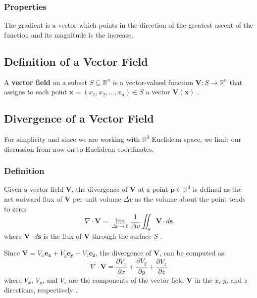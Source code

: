 \subsubsection{Properties}
The gradient is a vector which points in the direction of the greatest ascent of the function and its magnitude is the increase.

\subsection{Definition of a Vector Field}
A \textbf{vector field} on a subset \(S \subseteq \mathbb{R}^n\) is a vector-valued function \(\mathbf{V}: S \to \mathbb{R}^n\) that assigns to each point \(\mathbf{x} = (x_1, x_2, \ldots, x_n) \in S\) a vector \(\mathbf{V}(\mathbf{x})\) \cite{math-book}.

\subsection{Divergence of a Vector Field}
For simplicity and since we are working with \(\mathbb{R}^3\) Euclidean space, we limit our discussion from now on to Euclidean coordinates.

\subsubsection{Definition}
Given a vector field \(\mathbf{V}\), the divergence of  \(\mathbf{V}\) at a point \( \mathbf{p} \in \mathbb{R}^3 \) is defined as the net
outward flux of \(\mathbf{V}\) per unit volume \(\Delta v\) as the volume about the point tends to zero:
\begin{equation}
\nabla \cdot \mathbf{V} = \lim_{\Delta v \to 0} \frac{1}{\Delta v} \iint_S \mathbf{V} \cdot d\mathbf{s}
\label{eq:divergence}
\end{equation}
where \( \mathbf{V} \cdot d\mathbf{s} \) is the flux of \( \mathbf{V} \) through the surface \(S\) \cite{book-magnetism}.

Since \(\mathbf{V} = V_{x} \mathbf{e_x} + V_{y} \mathbf{e_y} + V_{z} \mathbf{e_z}\), the divergence of \(\mathbf{V}\), can be computed as:
\begin{equation}
\nabla \cdot \mathbf{V} = \frac{\partial V_{x}}{\partial x} + \frac{\partial V_{y}}{\partial y} + \frac{\partial V_{z}}{\partial z}
\end{equation}
where \(V_{x}\), \(V_{y}\), and \(V_{z}\) are the components of the vector field \(\mathbf{V}\) in the \(x\), \(y\), and \(z\) directions, respectively \cite{math-book}.

